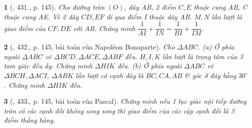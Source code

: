 \documentclass{article}
\newtheorem{baitoan}{}
\begin{document}
\begin{baitoan}[\cite{Binh_Toan_9_tap_2}, 431., p. 145]
	Cho đường tròn $(O)$, dây AB, 2 điểm $C,E$ thuộc cung AB, C thuộc cung AE. Vẽ 2 dây $CD,EF$ đi qua điểm I thuộc dây AB. $M,N$ lần lượt là giao điểm của $CF,DE$ với AB. Chứng minh $\dfrac{1}{AI} + \dfrac{1}{IN} = \dfrac{1}{BI} + \dfrac{1}{IM}$.
\end{baitoan}

\begin{baitoan}[\cite{Binh_Toan_9_tap_2}, 432., p. 145, bài toán của Napol\'eon Bonaparte]
	Cho $\Delta ABC$. (a) Ở phía ngoài $\Delta ABC$ vẽ $\Delta BCD,\Delta ACE,\Delta ABF$ đều. $H,I,K$ lần lượt là trọng tâm của 3 tam giác đều ấy. Chứng minh $\Delta HIK$ đều. (b) Ở phía ngoài $\Delta ABC$ vẽ $\Delta BCH,\Delta ACI$, $\Delta ABK$ lần lượt có cạnh đáy là $BC,CA,AB$ \& góc ở đáy bằng $30^\circ$. Chứng minh $\Delta HIK$ đều.
\end{baitoan}

\begin{baitoan}[\cite{Binh_Toan_9_tap_2}, 433., p. 145, bài toán của Pascal]
	Chứng minh nếu 1 lục giác nội tiếp đường tròn có các cạnh đối không song song thì giao điểm của các cặp cạnh đối là 3 điểm thẳng hàng.
\end{baitoan}


\printbibliography[heading=bibintoc]
\end{document}
